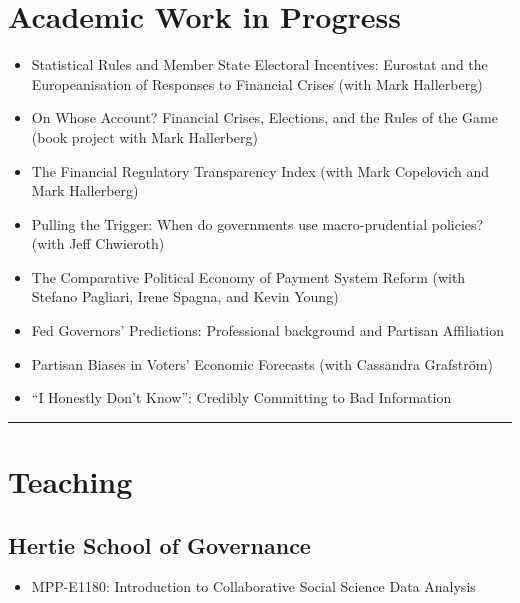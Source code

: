 \documentclass[a4paper]{article}
\begin{document}
{{\section*{Academic Work in Progress}

\begin{itemize}

    \item Statistical Rules and Member State Electoral Incentives: Eurostat and the Europeanisation of Responses to Financial Crises (with Mark Hallerberg)
    \item On Whose Account? Financial Crises, Elections, and the Rules of the Game (book project with Mark Hallerberg)
    \item The Financial Regulatory Transparency Index (with Mark Copelovich and Mark Hallerberg)
    \item Pulling the Trigger: When do governments use macro-prudential policies? (with Jeff Chwieroth)
    \item The Comparative Political Economy of Payment System Reform (with Stefano Pagliari, Irene Spagna, and Kevin Young)
    \item Fed Governors' Predictions: Professional background and Partisan Affiliation
    \item Partisan Biases in Voters' Economic Forecasts (with Cassandra Grafstr\"{o}m)
    \item ``I Honestly Don't Know'': Credibly Committing to Bad Information

\end{itemize}


\vspace{0.25cm}
\medskip\hrule height 1pt
\vspace{0.5cm}

\section*{Teaching}

\subsection*{Hertie School of Governance}

\begin{itemize}

    \item MPP-E1180: Introduction to Collaborative Social Science Data Analysis


\end{itemize}}}
\end{document}
